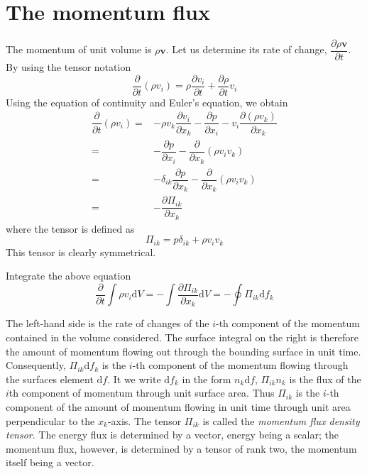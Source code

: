 \documentclass[conference]{IEEEtran}
\theoremstyle{definition}
\theoremstyle{remark}
\begin{document}
    \section{The momentum flux}
    The momentum of unit volume is $\rho \mathbf{v}$. Let us determine its rate of change, $\dfrac{\partial \rho \mathbf{v}}{\partial t}$. By using the tensor notation
    \[
        \dfrac{\partial}{\partial t} \left( \rho v_i \right) = \rho \dfrac{\partial v_i}{\partial t} + \dfrac{\partial \rho}{\partial t} v_i
    \]
    Using the equation of continuity and Euler's equation, we obtain
    \begin{align}
        \dfrac{\partial}{\partial t} \left( \rho v_i \right) =& -\rho v_k\dfrac{\partial v_i}{\partial x_k} - \dfrac{\partial p}{\partial x_i} - v_i \dfrac{\partial (\rho v_k)}{\partial x_k} \nonumber \\
        =& -\dfrac{\partial p}{\partial x_i} - \dfrac{\partial}{\partial x_k} (\rho v_i v_k) \nonumber \\
        =& -\delta_{ik} \dfrac{\partial p}{\partial x_k} - \dfrac{\partial}{\partial x_k} (\rho v_i v_k) \nonumber \\
        =& -\dfrac{\partial \Pi_{ik}}{\partial x_k}
    \end{align}
    where the tensor is defined as
    \begin{equation}
        \Pi_{ik} = p \delta_{ik} + \rho v_i v_k
    \end{equation}
    This tensor is clearly symmetrical.

    Integrate the above equation
    \[
        \dfrac{\partial}{\partial t} \int \rho v_i \mathrm{d} V = -\int\dfrac{\partial \Pi_{ik}}{\partial x_k} \mathrm{d} V = -\oint \Pi_{ik} \mathrm{d} f_k
    \]
    
    The left-hand side is the rate of changes of the $i$-th component of the momentum contained in the volume considered. The surface integral on the right is therefore the amount of momentum flowing out through the bounding surface in unit time. Consequently, $\Pi_{ik} \mathrm{d} f_k$ is the $i$-th component of the momentum flowing through the surfaces element $\mathrm{d} f$. It we write $\mathrm{d} f_k$ in the form $n_k \mathrm{d} f$, $\Pi_{ik} n_k$ is the flux of the $i$th component of momentum through unit surface area. Thus $\Pi_{ik}$ is the $i$-th component of the amount of momentum flowing in unit time through unit area perpendicular to the $x_k$-axis. The tensor $\Pi_{ik}$ is called the \emph{momentum flux density tensor}. The energy flux is determined by a vector, energy being a scalar; the momentum flux, however, is determined by a tensor of rank two, the momentum itself being a vector.
\end{document}
